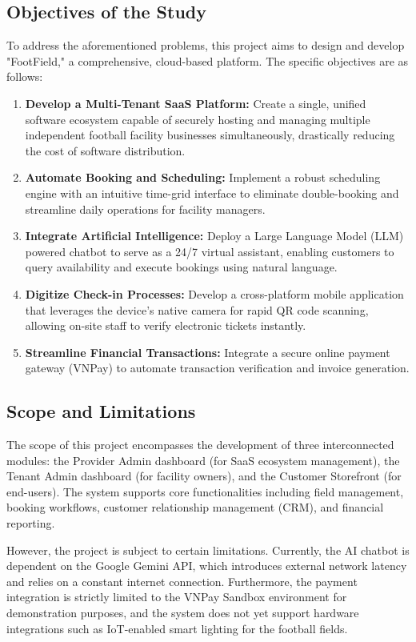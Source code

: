 \subsection{Objectives of the Study}
To address the aforementioned problems, this project aims to design and develop "FootField," a comprehensive, cloud-based platform. The specific objectives are as follows:
\begin{enumerate}
    \item \textbf{Develop a Multi-Tenant SaaS Platform:} Create a single, unified software ecosystem capable of securely hosting and managing multiple independent football facility businesses simultaneously, drastically reducing the cost of software distribution.
    \item \textbf{Automate Booking and Scheduling:} Implement a robust scheduling engine with an intuitive time-grid interface to eliminate double-booking and streamline daily operations for facility managers.
    \item \textbf{Integrate Artificial Intelligence:} Deploy a Large Language Model (LLM) powered chatbot to serve as a 24/7 virtual assistant, enabling customers to query availability and execute bookings using natural language.
    \item \textbf{Digitize Check-in Processes:} Develop a cross-platform mobile application that leverages the device's native camera for rapid QR code scanning, allowing on-site staff to verify electronic tickets instantly.
    \item \textbf{Streamline Financial Transactions:} Integrate a secure online payment gateway (VNPay) to automate transaction verification and invoice generation.
\end{enumerate}

\subsection{Scope and Limitations}
The scope of this project encompasses the development of three interconnected modules: the Provider Admin dashboard (for SaaS ecosystem management), the Tenant Admin dashboard (for facility owners), and the Customer Storefront (for end-users). The system supports core functionalities including field management, booking workflows, customer relationship management (CRM), and financial reporting.

However, the project is subject to certain limitations. Currently, the AI chatbot is dependent on the Google Gemini API, which introduces external network latency and relies on a constant internet connection. Furthermore, the payment integration is strictly limited to the VNPay Sandbox environment for demonstration purposes, and the system does not yet support hardware integrations such as IoT-enabled smart lighting for the football fields.

